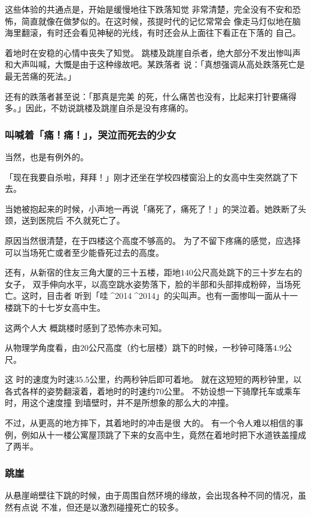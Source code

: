 \documentclass[UTF8]{ctexart}
\begin{document}
这些体验的共通点是，开始是缓慢地往下跌落知觉 非常清楚，完全没有不安和恐怖，简直就像在做梦似的。在这时候，孩提时代的记忆常常会 像走马灯似地在脑海里翻滚，有时还会看见神秘的光线，有时还会从上面往下看正在下落的 自己。

着地时在安稳的心情中丧失了知觉。 
跳楼及跳崖自杀者，绝大部分不发出惨叫声和大声叫喊，大慨是由于这种缘故吧。某跌落者 说：「真想强调从高处跌落死亡是最无苦痛的死法。」

还有的跌落者甚至说：「那真是完美 的死，什么痛苦也没有，比起来打针要痛得多。」因此，不妨说跳楼及跳崖自杀是没有疼痛的。 

\subsubsection*{叫喊着「痛！痛！」，哭泣而死去的少女}

当然，也是有例外的。

「现在我要自杀啦，拜拜！」刚才还坐在学校四楼窗沿上的女高中生突然跳了下去。

当她被抱起来的时候，小声地一再说「痛死了，痛死了！」的哭泣着。她跌断了头颈，送到医院后
不久就死亡了。

原因当然很清楚，在于四楼这个高度不够高的。
为了不留下疼痛的感觉，应选择可以当场死亡或者至少能昏死过去的高度。

还有，从新宿的住友三角大厦的三十五楼，距地$140$公尺高处跳下的三十岁左右的女子， 双手伸向水平，以高空跳水姿势落下，脸的半部和头部摔成粉碎，当场死亡。这时，目击者 听到「哇^^^^2014^^^^2014」的尖叫声。也有一面惨叫一面从十一楼跳下的十七岁女高中生。

这两个人大 概跳楼时感到了恐怖亦未可知。 

从物理学角度看，由$20$公尺高度（约七层楼）跳下的时候，一秒钟可降落$4.9$公尺。

这 时的速度为时速$35.5$公里，约两秒钟后即可着地。
就在这短短的两秒钟里，以各式各样的姿势翻滚着，着地时的时速约$70$公里。
不妨设想一下骑摩托车或乘车时，用这个速度撞 到墙壁时，并不是所想象的那么大的冲撞。

不过，从更高的地方摔下，其着地时的冲击是很 大的。
有一个令人难以相信的事例，例如从十一楼公寓屋顶跳了下来的女高中生，竟然在着地时把下水道铁盖撞成了两半。

\subsubsection*{跳崖}

从悬崖峭壁往下跳的时候，由于周围自然环境的缘故，会出现各种不同的情况，虽然有点说
不准，但还是以激烈碰撞死亡的较多。
\end{document}
